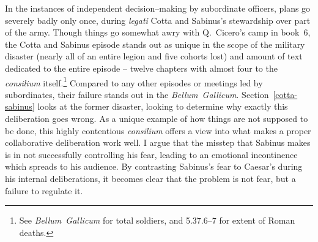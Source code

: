 \documentclass[12pt,letterpaper,oneside,final]{memoir}
\begin{document}
In the instances of independent decision--making by subordinate officers, plans go sev\-ere\-ly badly only once, during \emph{legati} Cotta and Sabinus's stewardship over part of the army. Though things go somewhat awry with Q.~Cicero's camp in book~6, the Cotta and Sabinus episode stands out as unique in the scope of the military disaster (nearly all of an entire legion and five cohorts lost) and amount of text dedicated to the entire episode -- twelve chapters with almost four to the \emph{consilium} itself.\footnote{See \emph{Bellum~Gallicum} for total soldiers, and 5.37.6--7 for extent of Roman deaths.} Compared to any other episodes or meetings led by subordinates, their failure stands out in the \emph{Bellum~Gallicum}. Section~\ref{cotta-sabinus} looks at the former disaster, looking to determine why exactly this deliberation goes wrong. As a unique example of how things are not supposed to be done, this highly contentious \emph{consilium} offers a view into what makes a proper collaborative deliberation work well. I argue that the misstep that Sabinus makes is in not successfully controlling his fear, leading to an emotional incontinence which spreads to his audience. By contrasting  Sabinus's fear to Caesar's during his internal deliberations, it becomes clear that the problem is not fear, but a failure to regulate it.
\end{document}
